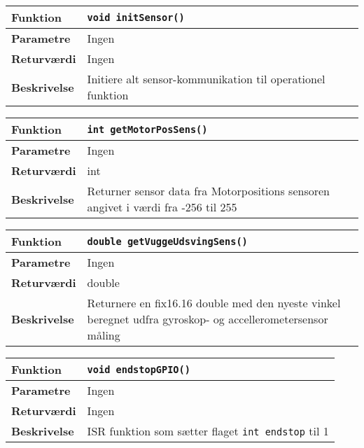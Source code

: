 \begin{center}
    \begin{tabular}{ | l | p{} |}
    \hline
    \textbf{Funktion}	& \verb+void initSensor() +				\\ \hline
    \textbf{Parametre} 	& Ingen							 		\\ \hline
    \textbf{Returværdi}	& Ingen									\\ \hline
    \textbf{Beskrivelse}	& Initiere alt sensor-kommunikation til operationel funktion	\\ \hline
    \end{tabular}
\end{center}

\begin{center}
    \begin{tabular}{ | l | p{} |}
    \hline
    \textbf{Funktion}	& \verb+int getMotorPosSens() +				\\ \hline
    \textbf{Parametre} 	& Ingen							 		\\ \hline
    \textbf{Returværdi}	& int									\\ \hline
    \textbf{Beskrivelse}	& Returner sensor data fra Motorpositions sensoren angivet i værdi fra -256 til 255	\\ \hline
    \end{tabular}
\end{center}

\begin{center}
    \begin{tabular}{ | l | p{} |}
    \hline
    \textbf{Funktion}	& \verb+double getVuggeUdsvingSens() +				\\ \hline
    \textbf{Parametre} 	& Ingen							 		\\ \hline
    \textbf{Returværdi}	& double								\\ \hline
    \textbf{Beskrivelse}	& Returnere en fix16.16 double med den nyeste vinkel beregnet udfra gyroskop- og accellerometersensor måling	\\ \hline
    \end{tabular}
\end{center}




\begin{center}
    \begin{tabular}{ | l | p{} |}
    \hline
    \textbf{Funktion}	& \verb+void endstopGPIO() +				\\ \hline
    \textbf{Parametre} 	& Ingen							 		\\ \hline
    \textbf{Returværdi}	& Ingen						\\ \hline
    \textbf{Beskrivelse}	& ISR funktion som sætter flaget \verb+int endstop+ til 1	\\ \hline
    \end{tabular}
\end{center}

